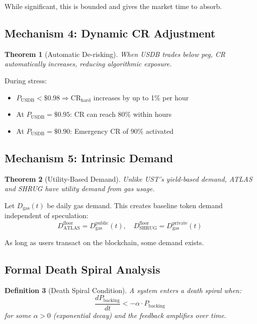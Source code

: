 \documentclass[11pt,a4paper]{article}
\newtheorem{theorem}{Theorem}[section]
\newtheorem{definition}[theorem]{Definition}
\begin{document}
While significant, this is bounded and gives the market time to absorb.

\subsection{Mechanism 4: Dynamic CR Adjustment}

\begin{theorem}[Automatic De-risking]
When USDB trades below peg, CR automatically increases, reducing algorithmic exposure.
\end{theorem}

During stress:
\begin{itemize}
    \item $P_{\text{USDB}} < \$0.98 \Rightarrow \text{CR}_{\text{hard}}$ increases by up to 1\% per hour
    \item At $P_{\text{USDB}} = \$0.95$: CR can reach 80\% within hours
    \item At $P_{\text{USDB}} = \$0.90$: Emergency CR of 90\% activated
\end{itemize}

\subsection{Mechanism 5: Intrinsic Demand}

\begin{theorem}[Utility-Based Demand]
Unlike UST's yield-based demand, ATLAS and SHRUG have utility demand from gas usage.
\end{theorem}

Let $D_{\text{gas}}(t)$ be daily gas demand. This creates baseline token demand independent of speculation:
\begin{equation}
D_{\text{ATLAS}}^{\text{floor}} = D_{\text{gas}}^{\text{public}}(t), \quad D_{\text{SHRUG}}^{\text{floor}} = D_{\text{gas}}^{\text{private}}(t)
\end{equation}

As long as users transact on the blockchain, some demand exists.

\subsection{Formal Death Spiral Analysis}

\begin{definition}[Death Spiral Condition]
A system enters a death spiral when:
\begin{equation}
\frac{dP_{\text{backing}}}{dt} < -\alpha \cdot P_{\text{backing}}
\end{equation}
for some $\alpha > 0$ (exponential decay) and the feedback amplifies over time.
\end{definition}
\end{document}
